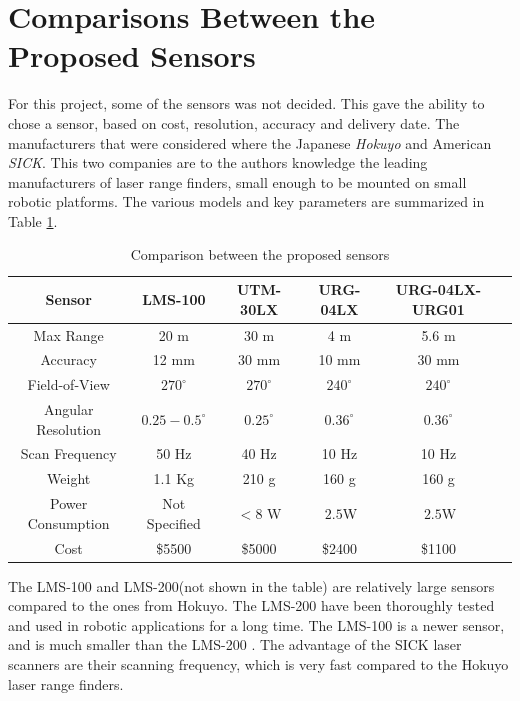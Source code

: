 \section{Comparisons Between the Proposed Sensors}
For this project, some of the sensors was not decided. This gave the ability to chose a
sensor, based on cost, resolution, accuracy and delivery date. The manufacturers that were
considered where the Japanese \emph{Hokuyo} and American \emph{SICK}. This two companies are to the
authors knowledge the leading manufacturers of laser range finders, small enough to be
mounted on small robotic platforms. The various models and key parameters are summarized
in Table \ref{chap3:tab-sensors}.
\begin{table}[htbp]
    \begin{tabular}{|c|c|c|c|c|c|}
        \hline
        Sensor              & LMS-100 & UTM-30LX & URG-04LX & URG-04LX-URG01 \\
        \hline
        Max Range           & 20 m    & 30 m     & 4 m      & 5.6 m          \\
        Accuracy            & 12 mm   & 30 mm    & 10 mm    & 30 mm          \\
        Field-of-View       & $270^\circ$& $270^\circ$ & $240^\circ$ & $240^\circ$  \\
        Angular Resolution  & $0.25-0.5^\circ$  & $0.25^\circ$ & $0.36^\circ$ & $0.36^\circ$  \\
        Scan Frequency      & 50 Hz   &  40 Hz   & 10 Hz    & 10 Hz          \\
        Weight              & 1.1 Kg  &  210 g    & 160 g    & 160 g          \\
        Power Consumption   & Not Specified  & $<8 $ W & $~2.5$W  &$~2.5$W  \\
        \hline
        Cost                & \$5500  & \$5000   & \$2400   & \$1100         \\
        \hline
    \end{tabular}
    \caption{Comparison between the proposed sensors}
    \label{chap3:tab-sensors}
\end{table}

The LMS-100 and LMS-200(not shown in the table) are relatively large sensors compared to
the ones from Hokuyo. The LMS-200 have been thoroughly tested and used in robotic
applications for a long time. The LMS-100 is a newer sensor, and is much smaller than the
LMS-200 \cite{SICKweb}. The advantage of the SICK laser scanners are their scanning
frequency, which is very fast compared to the Hokuyo laser range finders.

